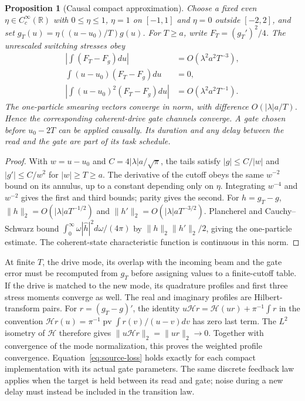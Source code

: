 \documentclass[12pt,a4paper]{article}
\newtheorem{proposition}[theorem]{Proposition}
\begin{document}
\begin{proposition}[Causal compact approximation]\label{prop:compact}
Choose a fixed even $\eta\in C_c^\infty(\mathbb R)$ with $0\le\eta\le1$,
$\eta=1$ on $[-1,1]$ and $\eta=0$ outside $[-2,2]$, and set
$g_T(u)=\eta((u-u_0)/T)g(u)$. For $T\ge a$, write $F_T=(g_T')^2/4$.
The unrescaled switching stresses obey
\begin{align}
 \left|\int(F_T-F_g)du\right|&=O(\lambda^2a^2T^{-3}),\nonumber\\
 \int(u-u_0)(F_T-F_g)du&=0,\nonumber\\
 \left|\int(u-u_0)^2(F_T-F_g)du\right|&=O(\lambda^2a^2T^{-1}).
 \label{eq:compact-moments}
\end{align}
The one-particle smearing vectors converge in norm, with difference
$O(|\lambda|a/T)$. Hence the corresponding coherent-drive gate channels converge.
A gate chosen before $u_0-2T$ can be applied causally. Its duration and any delay
between the read and the gate are part of its task schedule.
\end{proposition}
\begin{proof}
With $w=u-u_0$ and $C=4|\lambda|a/\sqrt\pi$, the tails satisfy
$|g|\le C/|w|$ and $|g'|\le C/w^2$ for $|w|\ge T\ge a$.
The derivative of the cutoff obeys the same $w^{-2}$ bound on its annulus,
up to a constant depending only on $\eta$. Integrating $w^{-4}$ and $w^{-2}$
gives the first and third bounds; parity gives the second.
For $h=g_T-g$, $\|h\|_2=O(|\lambda|aT^{-1/2})$ and
$\|h'\|_2=O(|\lambda|aT^{-3/2})$. Plancherel and Cauchy--Schwarz bound
$\int_0^\infty\omega|\hat h|^2d\omega/(4\pi)$ by
$\|h\|_2\|h'\|_2/2$, giving the one-particle estimate.
The coherent-state characteristic function is continuous in this norm.
\end{proof}

At finite $T$, the drive mode, its overlap with the incoming beam and the gate error
must be recomputed from $g_T$ before assigning values to a finite-cutoff table.
If the drive is matched to the new mode, its
quadrature profiles and first three stress moments converge as well. The real and
imaginary profiles are Hilbert-transform pairs. For $r=(g_T-g)'$, the identity
$u\mathcal Hr=\mathcal H(ur)+\pi^{-1}\int r$ in the convention
$\mathcal Hr(u)=\pi^{-1}\operatorname{pv}\int r(v)/(u-v)dv$ has zero last term.
The $L^2$ isometry of $\mathcal H$ therefore gives
$\|u\mathcal Hr\|_2=\|ur\|_2\to0$. Together with convergence of the mode
normalization, this proves the weighted profile convergence.
Equation~\eqref{eq:source-loss} holds exactly for each compact
implementation with its actual gate parameters. The same discrete feedback law
applies when the target is held between its read and gate; noise during a new delay
must instead be included in the transition law.
\end{document}
